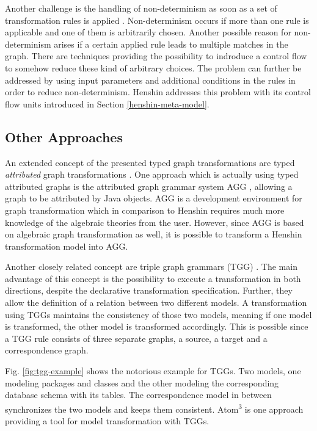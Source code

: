 \documentclass[runningheads]{llncs}
\begin{document}
Another challenge is the handling of non-determinism as soon as a set of transformation rules is applied \cite{taentzer2005model}. Non-determinism occurs if more than one rule is applicable and one of them is arbitrarily chosen. Another possible reason for non-determinism arises if a certain applied rule leads to multiple matches in the graph. There are techniques providing the possibility to indroduce a control flow to somehow reduce these kind of arbitrary choices. The problem can further be addressed by using input parameters and additional conditions in the rules in order to reduce non-determinism. Henshin addresses this problem with its control flow units introduced in Section \ref{henshin-meta-model}.

\subsection{Other Approaches}
An extended concept of the presented typed graph transformations are typed \textit{attributed} graph transformations \cite{10.1007/978-3-540-30203-2_13}. One approach which is actually using typed attributed graphs is the attributed graph grammar system AGG \cite{agg}, allowing a graph to be attributed by Java objects. AGG is a development environment for graph transformation which in comparison to Henshin requires much more knowledge of the algebraic theories from the user. However, since AGG is based on algebraic graph transformation as well, it is possible to transform a Henshin transformation model into AGG.

Another closely related concept are triple graph grammars (TGG) \cite{Schurr:1994:SGT:647675.731658}. The main advantage of this concept is the possibility to execute a transformation in both directions, despite the declarative transformation specification. Further, they allow the definition of a relation between two different models. A transformation using TGGs maintains the consistency of those two models, meaning if one model is transformed, the other model is transformed accordingly. This is possible since a TGG rule consists of three separate graphs, a source, a target and a correspondence graph.

Fig. \ref{fig:tgg-example} shows the notorious example for TGGs. Two models, one modeling packages and classes and the other modeling the corresponding database schema with its tables. The correspondence model in between synchronizes the two models and keeps them consistent. Atom\textsuperscript{3} \cite{taentzer2005model,10.1007/3-540-45923-5_12} is one approach providing a tool for model transformation with TGGs.
\end{document}
